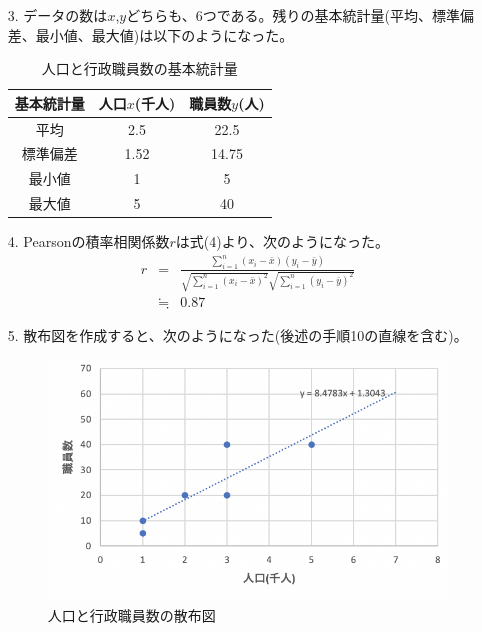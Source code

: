 \documentclass[12pt]{jarticle}
\begin{document}
\begin{itemize}
    \item [3.]データの数は$x$,$y$どちらも、6つである。残りの基本統計量(平均、標準偏差、最小値、最大値)は以下のようになった。
          \begin{table}[htb]
              \begin{center}
                  \caption{人口と行政職員数の基本統計量}
                  \begin{tabular}{|c|c|c|} \hline
                      基本統計量 & 人口$x$(千人) & 職員数$y$(人) \\ \hline
                      平均       & 2.5           & 22.5          \\
                      標準偏差   & 1.52          & 14.75         \\
                      最小値     & 1             & 5             \\
                      最大値     & 5             & 40            \\ \hline
                  \end{tabular}
              \end{center}
          \end{table}


    \item [4.]Pearsonの積率相関係数$r$は式(4)より、次のようになった。
          \begin{eqnarray}
              r&=&\frac{\sum_{i=1}^{n} (x_i-\bar{x})(y_i-\bar{y})}{\sqrt{\sum_{i=1}^{n} (x_i-\bar{x})^2} \sqrt{\sum_{i=1}^{n} (y_i-\bar{y})^2}} \nonumber\\
              &\fallingdotseq &0.87 \nonumber
          \end{eqnarray}

    \item [5.]散布図を作成すると、次のようになった(後述の手順10の直線を含む)。
          \begin{figure}[h]
              \begin{center}
                  \includegraphics[scale=0.7]{kadai4_2_fig1.png}
              \end{center}
              \caption{人口と行政職員数の散布図}
          \end{figure}
          \clearpage


\end{itemize}
\end{document}
